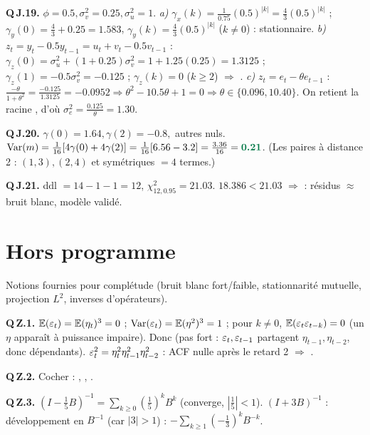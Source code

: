 \documentclass[11pt]{article}
\begin{document}
\textbf{Q\,J.19.} $\phi=0.5,\sigma_v^2=0.25,\sigma_u^2=1$.
\emph{a)} $\gamma_x(k)=\frac{1}{0.75}(0.5)^{|k|}=\frac43(0.5)^{|k|}$ ;
$\gamma_y(0)=\frac43+0.25=1.583$, $\gamma_y(k)=\frac43(0.5)^{|k|}$ ($k\ne0$) : stationnaire.
\emph{b)} $z_t=y_t-0.5y_{t-1}=u_t+v_t-0.5v_{t-1}$ :
$\gamma_z(0)=\sigma_u^2+(1+0.25)\sigma_v^2=1+1.25(0.25)=1.3125$ ;
$\gamma_z(1)=-0.5\sigma_v^2=-0.125$ ; $\gamma_z(k)=0$ ($k\ge2$) $\Rightarrow$ .
\emph{c)} $z_t=e_t-\theta e_{t-1}$ : $\frac{-\theta}{1+\theta^2}=\frac{-0.125}{1.3125}=-0.0952
\Rightarrow\theta^2-10.5\theta+1=0\Rightarrow\theta\in\{0.096,10.40\}$. On retient la racine
, d'où $\sigma_e^2=\frac{0.125}{\theta}=1.30$.

\textbf{Q\,J.20.} $\gamma(0)=1.64,\gamma(2)=-0.8,$ autres nuls.
$\Var(m)=\frac1{16}[4\gamma(0)+4\gamma(2)]=\frac1{16}[6.56-3.2]=\frac{3.36}{16}=\bonne{0.21}$.
(Les paires à distance 2 : $(1,3),(2,4)$ et symétriques $=4$ termes.)

\textbf{Q\,J.21.} ddl $=14-1-1=12$, $\chi^2_{12,0.95}=21.03$. $18.386<21.03$ $\Rightarrow$
 : résidus $\approx$ bruit blanc, modèle validé.

\section{Hors programme\,\texorpdfstring{\horsprog}{*}}
\begin{tcolorbox}[colback=orangelight,colframe=orange,title={Au-delà du cours BADAOUI}]
Notions fournies pour complétude (bruit blanc fort/faible, stationnarité mutuelle, projection
$L^2$, inverses d'opérateurs).
\end{tcolorbox}

\textbf{Q\,Z.1.} $\mathbb{E}(\varepsilon_t)=\mathbb{E}(\eta_t)^3=0$ ; $\operatorname{Var}(\varepsilon_t)=\mathbb{E}(\eta^2)^3=1$ ; pour $k\ne0$,
$\mathbb{E}(\varepsilon_t\varepsilon_{t-k})=0$ (un $\eta$ apparaît à puissance impaire). Donc  (pas fort : $\varepsilon_t,\varepsilon_{t-1}$ partagent $\eta_{t-1},\eta_{t-2}$, donc dépendants).
$\varepsilon_t^2=\eta_t^2\eta_{t-1}^2\eta_{t-2}^2$ : ACF nulle après le retard 2 $\Rightarrow$
.

\textbf{Q\,Z.2.} Cocher : , , .

\textbf{Q\,Z.3.} $(I-\tfrac15B)^{-1}=\sum_{k\ge0}(\tfrac15)^kB^k$ (converge, $|\tfrac15|<1$).
$(I+3B)^{-1}$ : développement en $B^{-1}$ (car $|3|>1$) :
$-\sum_{k\ge1}(-\tfrac13)^kB^{-k}$.
\end{document}
